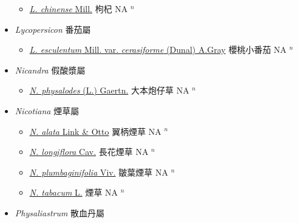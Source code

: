 \begin{itemize}
  \begin{itemize}
        \item[] \href{http://www.theplantlist.org/tpl1.1/search?q=Lycium+chinense}{\textit{L. chinense} Mill.}   枸杞 NA $^n$
  \end{itemize}
 \item[] \textit{Lycopersicon} 番茄屬
                    
  \begin{itemize}
        \item[] \href{http://www.theplantlist.org/tpl1.1/search?q=Lycopersicon+esculentum+var.+cerasiforme}{\textit{L. esculentum} Mill. var. \textit{cerasiforme} (Dunal) A.Gray}   櫻桃小番茄 NA $^n$
  \end{itemize}
 \item[] \textit{Nicandra} 假酸漿屬
                    
  \begin{itemize}
        \item[] \href{http://www.theplantlist.org/tpl1.1/search?q=Nicandra+physalodes}{\textit{N. physalodes} (L.) Gaertn.}   大本炮仔草 NA $^n$
  \end{itemize}
 \item[] \textit{Nicotiana} 煙草屬
                    
  \begin{itemize}
        \item[] \href{http://www.theplantlist.org/tpl1.1/search?q=Nicotiana+alata}{\textit{N. alata} Link \& Otto}   翼柄煙草 NA $^n$
        \item[] \href{http://www.theplantlist.org/tpl1.1/search?q=Nicotiana+longiflora}{\textit{N. longiflora} Cav.}   長花煙草 NA $^n$
        \item[] \href{http://www.theplantlist.org/tpl1.1/search?q=Nicotiana+plumbaginifolia}{\textit{N. plumbaginifolia} Viv.}   皺葉煙草 NA $^n$
        \item[] \href{http://www.theplantlist.org/tpl1.1/search?q=Nicotiana+tabacum}{\textit{N. tabacum} L.}   煙草 NA $^n$
  \end{itemize}
 \item[] \textit{Physaliastrum} 散血丹屬
                    

\end{itemize}

